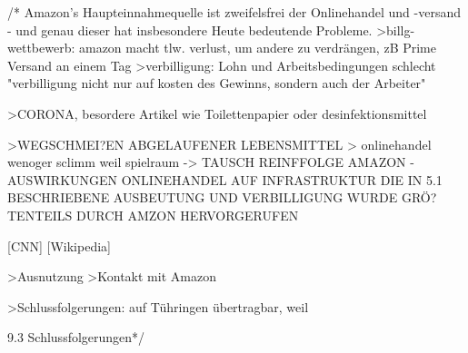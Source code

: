 /*
Amazon's Haupteinnahmequelle ist zweifelsfrei der Onlinehandel und -versand - und genau dieser hat insbesondere Heute bedeutende Probleme. 
  >billg-wettbewerb: amazon macht tlw. verlust, um andere zu verdrängen, zB Prime Versand an einem Tag
  >verbilligung: Lohn und Arbeitsbedingungen schlecht "verbilligung nicht nur auf kosten des Gewinns, sondern auch der Arbeiter"



>CORONA, besordere Artikel wie Toilettenpapier oder desinfektionsmittel

>WEGSCHMEI?EN ABGELAUFENER LEBENSMITTEL > onlinehandel wenoger sclimm weil spielraum
-> TAUSCH REINFFOLGE   AMAZON - AUSWIRKUNGEN ONLINEHANDEL AUF INFRASTRUKTUR
DIE IN 5.1 BESCHRIEBENE AUSBEUTUNG UND VERBILLIGUNG WURDE GRÖ?TENTEILS DURCH AMZON HERVORGERUFEN


[CNN]
[Wikipedia]

>Ausnutzung
>Kontakt mit Amazon

>Schlussfolgerungen: auf Tühringen übertragbar, weil 

9.3 Schlussfolgerungen*/
